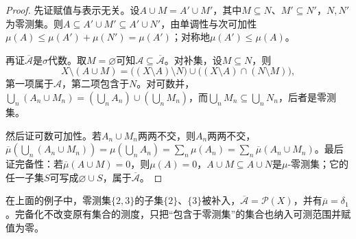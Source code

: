 \begin{proof}
先证赋值与表示无关。设$A\cup M=A'\cup M'$，其中$M\subseteq N$、$M'\subseteq N'$，$N,N'$为零测集。则$A\subseteq A'\cup M'\subseteq A'\cup N'$，由单调性与次可加性$\mu(A)\le\mu(A')+\mu(N')=\mu(A')$；对称地$\mu(A')\le\mu(A)$。

再证$\overline{\mathcal A}$是$\sigma$代数。取$M=\varnothing$可知$\mathcal A\subseteq\overline{\mathcal A}$。对补集，设$M\subseteq N$，则
\[
 X\setminus(A\cup M)=\bigl((X\setminus A)\setminus N\bigr)\cup\bigl((X\setminus A)\cap(N\setminus M)\bigr),
\]
第一项属于$\mathcal A$，第二项包含于$N$。对可数并，$\bigcup_n(A_n\cup M_n)=(\bigcup_nA_n)\cup(\bigcup_nM_n)$，而$\bigcup_nM_n\subseteq\bigcup_nN_n$，后者是零测集。

然后证可数可加性。若$A_n\cup M_n$两两不交，则$A_n$两两不交，$\overline\mu(\bigcup_n(A_n\cup M_n))=\mu(\bigcup_nA_n)=\sum_n\mu(A_n)=\sum_n\overline\mu(A_n\cup M_n)$。最后证完备性：若$\overline\mu(A\cup M)=0$，则$\mu(A)=0$，$A\cup M\subseteq A\cup N$是$\mu$-零测集；它的任一子集$S$可写成$\varnothing\cup S$，属于$\overline{\mathcal A}$。
\end{proof}

在上面的例子中，零测集$\{2,3\}$的子集$\{2\}$、$\{3\}$被补入，$\overline{\mathcal A}=\mathcal P(X)$，并有$\overline\mu=\delta_1$。完备化不改变原有集合的测度，只把“包含于零测集”的集合也纳入可测范围并赋值为零。
